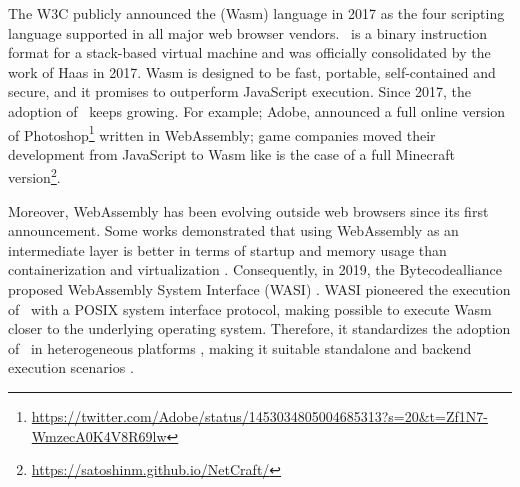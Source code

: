 \msection{\Wasm}


The W3C publicly announced the \Wasm(Wasm) language in 2017 as the four scripting language supported in all major web browser vendors.
\wasm\ is a binary instruction format for a stack-based virtual machine and was officially consolidated by the work of Haas \etal \cite{Haas_2017} in 2017. 
Wasm is designed to be fast, portable, self-contained and secure, and it promises to outperform JavaScript execution. 
Since 2017, the adoption of \wasm\ keeps growing. 
For example; Adobe, announced a full online version of Photoshop\footnote{\url{https://twitter.com/Adobe/status/1453034805004685313?s=20&t=Zf1N7-WmzecA0K4V8R69lw}} written in WebAssembly;  game companies moved their development from JavaScript to Wasm like is the case of a full Minecraft version\footnote{\url{https://satoshinm.github.io/NetCraft/}}. 

Moreover, WebAssembly has been evolving outside web browsers since its first announcement.
Some works demonstrated that using WebAssembly as an intermediate layer is better in terms of startup and memory usage than containerization and virtualization \cite{pMendkiServerless, 1244493Jacobsson}. 
Consequently, in 2019, the Bytecodealliance proposed WebAssembly System Interface (WASI) \cite{WASI}. 
WASI pioneered the execution of \wasm\ with a POSIX system interface protocol, making possible to execute Wasm closer to the underlying operating system. 
Therefore, it standardizes the adoption of \wasm\ in heterogeneous platforms \cite{bryant2020webassembly}, making it suitable standalone and backend execution scenarios \cite{9640153, wen2020wasmachine}.

